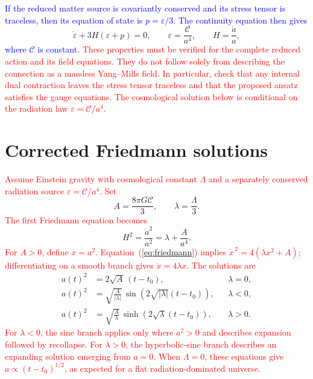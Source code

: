 \documentclass[prd,reprint,eqsecnum,nofootinbib]{revtex4-1}
\newcommand{\lang}[1]{\textcolor{blue}{#1}}
\newcommand{\science}[1]{\textcolor{red}{#1}}
\begin{document}
\lang{If the reduced matter source is covariantly conserved and its stress tensor is traceless, then its equation of state is $p=\varepsilon/3$. The continuity equation then gives}
\begin{equation}
  \dot{\varepsilon}+3H(\varepsilon+p)=0,
  \qquad
  \varepsilon=\frac{\mathcal C}{a^4},
  \qquad H=\frac{\dot a}{a},
\end{equation}
\lang{where $\mathcal C$ is constant.}
\science{These properties must be verified for the complete reduced action and its field equations. They do not follow solely from describing the connection as a massless Yang--Mills field. In particular, check that any internal dual contraction leaves the stress tensor traceless and that the proposed ansatz satisfies the gauge equations. The cosmological solution below is conditional on the radiation law $\varepsilon=\mathcal C/a^4$.}

\section{Corrected Friedmann solutions}

\science{Assume Einstein gravity with cosmological constant $\Lambda$ and a separately conserved radiation source $\varepsilon=\mathcal C/a^4$. Set}
\begin{equation}
  A=\frac{8\pi G\mathcal C}{3},
  \qquad
  \lambda=\frac{\Lambda}{3}.
\end{equation}
\science{The first Friedmann equation becomes}
\begin{equation}
  H^2=\frac{\dot a^2}{a^2}
  =\lambda+\frac{A}{a^4}.
  \label{eq:friedmann}
\end{equation}
\science{For $A>0$, define $x=a^2$. Equation~(\ref{eq:friedmann}) implies
$\dot{x}^{\,2}=4(\lambda x^2+A)$; differentiating on a smooth branch gives
$\ddot{x}=4\lambda x$. The solutions are}
\begin{align}
  a(t)^2 &= 2\sqrt{A}\,(t-t_0),
  && \lambda=0, \label{eq:flat}\\
  a(t)^2 &= \sqrt{\frac{A}{|\lambda|}}\,
  \sin\!\left(2\sqrt{|\lambda|}(t-t_0)\right),
  && \lambda<0, \label{eq:negative}\\
  a(t)^2 &= \sqrt{\frac{A}{\lambda}}\,
  \sinh\!\left(2\sqrt{\lambda}(t-t_0)\right),
  && \lambda>0. \label{eq:positive}
\end{align}
\science{For $\lambda<0$, the sine branch applies only where $a^2>0$ and describes expansion followed by recollapse. For $\lambda>0$, the hyperbolic-sine branch describes an expanding solution emerging from $a=0$. When $\Lambda=0$, these equations give $a\propto(t-t_0)^{1/2}$, as expected for a flat radiation-dominated universe.}
\end{document}
